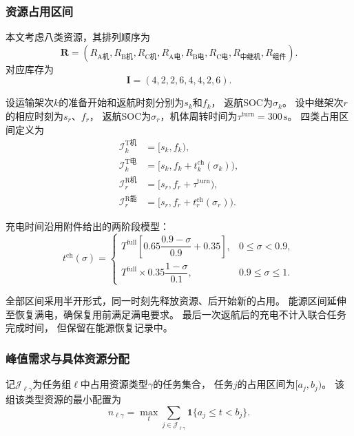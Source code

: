 \documentclass[bwprint]{gmcmthesis}
\begin{document}
\subsubsection{资源占用区间}

本文考虑八类资源，其排列顺序为
\begin{equation}
\boldsymbol{R}=
\left(
R_{\mathrm{A机}},R_{\mathrm{B机}},R_{\mathrm{C机}},
R_{\mathrm{A电}},R_{\mathrm{B电}},R_{\mathrm{C电}},
R_{\mathrm{中继机}},R_{\mathrm{组件}}
\right).
\end{equation}
对应库存为
\begin{equation}
\boldsymbol{I}=(4,2,2,6,4,4,2,6).
\end{equation}

设运输架次$k$的准备开始和返航时刻分别为$s_k$和$f_k$，
返航SOC为$\sigma_k$。
设中继架次$r$的相应时刻为$s_r$、$f_r$，
返航SOC为$\sigma_r$，机体周转时间为$\tau^{\mathrm{turn}}=300\,\mathrm{s}$。
四类占用区间定义为
\begin{align}
\mathcal{I}^{\mathrm{T机}}_k
&=[s_k,f_k),\\
\mathcal{I}^{\mathrm{T电}}_k
&=[s_k,f_k+t^{\mathrm{ch}}_k(\sigma_k)),\\
\mathcal{I}^{\mathrm{R机}}_r
&=[s_r,f_r+\tau^{\mathrm{turn}}),\\
\mathcal{I}^{\mathrm{R能}}_r
&=[s_r,f_r+t^{\mathrm{ch}}_r(\sigma_r)).
\end{align}

充电时间沿用附件给出的两阶段模型：
\begin{equation}
t^{\mathrm{ch}}(\sigma)=
\begin{cases}
T^{\mathrm{full}}
\left[
0.65\dfrac{0.9-\sigma}{0.9}+0.35
\right],
&0\leq \sigma<0.9,\\[2mm]
T^{\mathrm{full}}\times0.35
\dfrac{1-\sigma}{0.1},
&0.9\leq \sigma\leq1.
\end{cases}
\end{equation}

全部区间采用半开形式，同一时刻先释放资源、后开始新的占用。
能源区间延伸至恢复满电，确保复用前满足满电要求。
最后一次返航后的充电不计入联合任务完成时间，
但保留在能源恢复记录中。

\subsubsection{峰值需求与具体资源分配}

记$\mathcal{J}_{\ell\gamma}$为任务组$\ell$中占用资源类型$\gamma$的任务集合，
任务$j$的占用区间为$[a_j,b_j)$。
该组该类型资源的最小配置为
\begin{equation}
n_{\ell\gamma}
=
\max_t
\sum_{j\in\mathcal{J}_{\ell\gamma}}
\mathbf{1}\{a_j\leq t<b_j\}.
\label{eq:q4_peak}
\end{equation}
\end{document}
